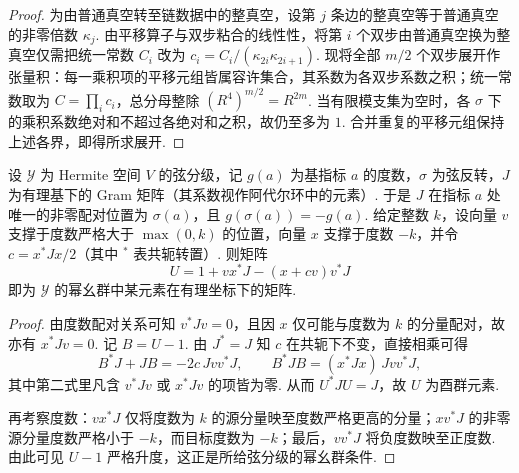 \begin{proof}
为由普通真空转至链数据中的整真空，设第 $j$ 条边的整真空等于普通真空的非零倍数 $\kappa_j$. 由平移算子与双步粘合的线性性，将第 $i$ 个双步由普通真空换为整真空仅需把统一常数 $C_i$ 改为 $c_i=C_i/(\kappa_{2i}\kappa_{2i+1})$. 现将全部 $m/2$ 个双步展开作张量积：每一乘积项的平移元组皆属容许集合，其系数为各双步系数之积；统一常数取为 $C=\prod_i c_i$，总分母整除 $(R^4)^{m/2}=R^{2m}$. 当有限模支集为空时，各 $\sigma$ 下的乘积系数绝对和不超过各绝对和之积，故仍至多为 $1$. 合并重复的平移元组保持上述各界，即得所求展开.
\end{proof}

\begin{lemma}
\label{lem:a-bessel-eichler}
\emitthmsource
设 $\mathcal Y$ 为 Hermite 空间 $V$ 的弦分级，记 $g(a)$ 为基指标 $a$ 的度数，$\sigma$ 为弦反转，$J$ 为有理基下的 Gram 矩阵（其系数视作阿代尔环中的元素）. 于是 $J$ 在指标 $a$ 处唯一的非零配对位置为 $\sigma(a)$，且 $g(\sigma(a))=-g(a)$. 给定整数 $k$，设向量 $v$ 支撑于度数严格大于 $\max(0,k)$ 的位置，向量 $x$ 支撑于度数 $-k$，并令 $c=x^\ast Jx/2$（其中 $^\ast$ 表共轭转置）. 则矩阵
\[
 U=1+v x^\ast J-(x+c v)v^\ast J
\]
即为 $\mathcal Y$ 的幂幺群中某元素在有理坐标下的矩阵.
\end{lemma}
\begin{proof}
由度数配对关系可知 $v^\ast Jv=0$，且因 $x$ 仅可能与度数为 $k$ 的分量配对，故亦有 $x^\ast Jv=0$. 记 $B=U-1$. 由 $J^\ast=J$ 知 $c$ 在共轭下不变，直接相乘可得
\[
 B^\ast J+JB=-2c\,Jv v^\ast J,\qquad
 B^\ast JB=(x^\ast Jx)\,Jv v^\ast J ,
\]
其中第二式里凡含 $v^\ast Jv$ 或 $x^\ast Jv$ 的项皆为零. 从而 $U^\ast JU=J$，故 $U$ 为酉群元素.

再考察度数：$v x^\ast J$ 仅将度数为 $k$ 的源分量映至度数严格更高的分量；$x v^\ast J$ 的非零源分量度数严格小于 $-k$，而目标度数为 $-k$；最后，$v v^\ast J$ 将负度数映至正度数. 由此可见 $U-1$ 严格升度，这正是所给弦分级的幂幺群条件.
\end{proof}


